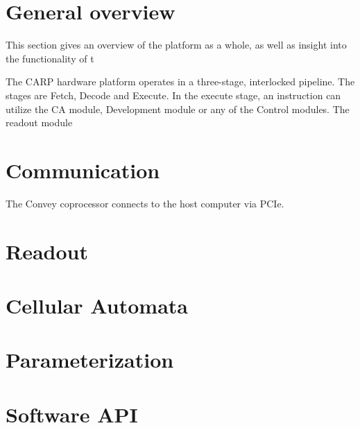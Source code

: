 \section{General overview}

This section gives an overview of the platform as a whole, as well as insight
into the functionality of t

The CARP hardware platform operates in a three-stage, interlocked pipeline. The
stages are Fetch, Decode and Execute. In the execute stage, an instruction can
utilize the CA module, Development module or any of the Control modules. The
readout module

\section{Communication}

The Convey coprocessor connects to the host computer via PCIe. 

\section{Readout}

\section{Cellular Automata}

\section{Parameterization}

\section{Software API}

\cleardoublepage
